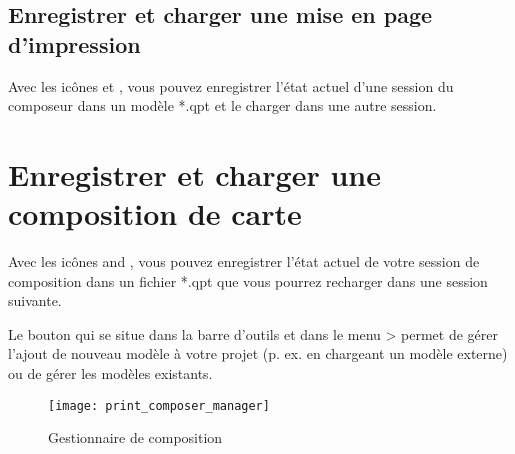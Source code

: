 \subsection{Enregistrer et charger une mise en page d'impression}

Avec les icônes  et , vous pouvez enregistrer l'état actuel d'une session du composeur dans un modèle *.qpt et le charger dans une autre session.

\section{Enregistrer et charger une composition de carte}

Avec les icônes  and , vous pouvez enregistrer l'état actuel de votre session de composition dans un fichier *.qpt que vous pourrez recharger dans une session suivante.

Le bouton  qui se situe dans la barre d'outils et dans le menu  >  permet de gérer l'ajout de nouveau modèle à votre projet (p. ex. en chargeant un modèle externe) ou de gérer les modèles existants.

\begin{figure}[h]
   \centering
   \texttt{[image: print\_composer\_manager]}   
   \caption{Gestionnaire de composition \nixcaption}
   \label{fig:print_composer_manager}
\end{figure}

\FloatBarrier
